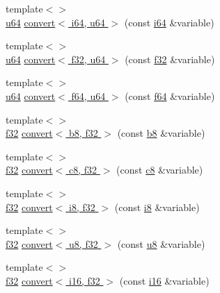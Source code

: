 \begin{DoxyCompactItemize}
\item 
{\footnotesize template$<$$>$ }\\\hyperlink{types_8h_a3f7e2bcbb0b4c338f3c4f6c937cd4234}{u64} \hyperlink{namespacecrap_a3b732ecadbbc5a3c00dafc1f85b329f5}{convert$<$ i64, u64 $>$} (const \hyperlink{types_8h_a85cb35fbe5bf2961d7ad5f26814a91a2}{i64} \&variable)
\item 
{\footnotesize template$<$$>$ }\\\hyperlink{types_8h_a3f7e2bcbb0b4c338f3c4f6c937cd4234}{u64} \hyperlink{namespacecrap_a12329c793aa8f5d875e580187ebc7476}{convert$<$ f32, u64 $>$} (const \hyperlink{types_8h_a154db6eda6a99565cb060a1da4b4c930}{f32} \&variable)
\item 
{\footnotesize template$<$$>$ }\\\hyperlink{types_8h_a3f7e2bcbb0b4c338f3c4f6c937cd4234}{u64} \hyperlink{namespacecrap_a861f2c37c3e349d28162b8984c766711}{convert$<$ f64, u64 $>$} (const \hyperlink{types_8h_a76c9f53497f766e57b184bc8a93ab73f}{f64} \&variable)
\item 
{\footnotesize template$<$$>$ }\\\hyperlink{types_8h_a154db6eda6a99565cb060a1da4b4c930}{f32} \hyperlink{namespacecrap_a319c84808e2e99b7a4ac1250f80ddef6}{convert$<$ b8, f32 $>$} (const \hyperlink{types_8h_a74eb47b4ab9e428eab7b91b3b877fa6c}{b8} \&variable)
\item 
{\footnotesize template$<$$>$ }\\\hyperlink{types_8h_a154db6eda6a99565cb060a1da4b4c930}{f32} \hyperlink{namespacecrap_a1149941f4b9db82e2d5c5eef58062e43}{convert$<$ c8, f32 $>$} (const \hyperlink{types_8h_aa1ba8aac9fcd831012308297336ac74b}{c8} \&variable)
\item 
{\footnotesize template$<$$>$ }\\\hyperlink{types_8h_a154db6eda6a99565cb060a1da4b4c930}{f32} \hyperlink{namespacecrap_ac4911f62d554935b72547154a1dccb59}{convert$<$ i8, f32 $>$} (const \hyperlink{types_8h_ae3702327b5f47e83b431e22b33da7b58}{i8} \&variable)
\item 
{\footnotesize template$<$$>$ }\\\hyperlink{types_8h_a154db6eda6a99565cb060a1da4b4c930}{f32} \hyperlink{namespacecrap_af3fc3ea1a755d48ac953d5550aa916e3}{convert$<$ u8, f32 $>$} (const \hyperlink{types_8h_a92c50087ca0e64fa93fc59402c55f8ca}{u8} \&variable)
\item 
{\footnotesize template$<$$>$ }\\\hyperlink{types_8h_a154db6eda6a99565cb060a1da4b4c930}{f32} \hyperlink{namespacecrap_ae783a2e04c7c643034dbfb183016de96}{convert$<$ i16, f32 $>$} (const \hyperlink{types_8h_ad309dbcaeea13aa602d686964156ea0b}{i16} \&variable)

\end{DoxyCompactItemize}
